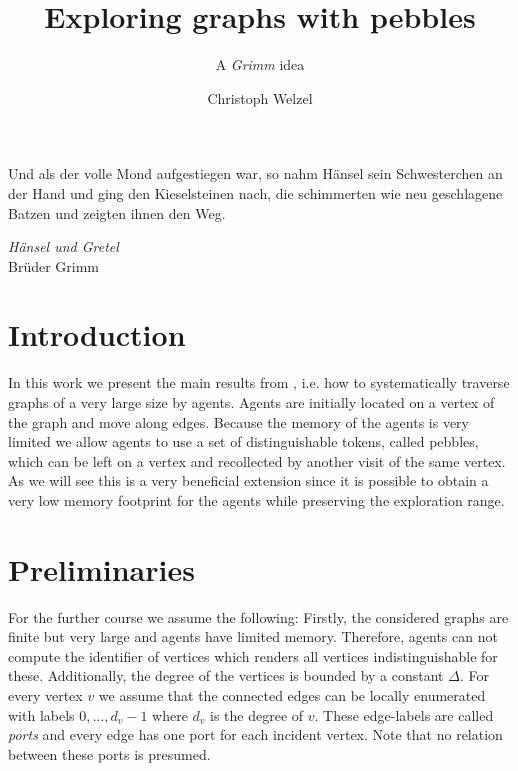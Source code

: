 \documentclass[oneside]{scrartcl}
\begin{document}
\setlength{\epigraphwidth}{0.7\textwidth}

\title{Exploring graphs with pebbles}
\subtitle{A \emph{Grimm} idea}
\author{Christoph Welzel}
\maketitle

\epigraph{Und als der volle Mond aufgestiegen war, so nahm Hänsel sein %
Schwesterchen an der Hand und ging den Kieselsteinen nach, die schimmerten %
wie neu geschlagene Batzen und zeigten ihnen den Weg.}%
{\emph{Hänsel und Gretel}\\Brüder Grimm}

\section{Introduction}
In this work we present the main results from \cite{pebbles}, i.e.
how to systematically traverse graphs of a very large size by agents.
Agents are initially located on a vertex of the graph and move along edges.
Because the memory of the agents is very limited we allow agents to use a set
of distinguishable tokens, called pebbles, which can be left on a vertex and
recollected by another visit of the same vertex. As we will see this is a very
beneficial extension since it is possible to obtain a very low memory footprint
for the agents while preserving the exploration range.

\section{Preliminaries}
For the further course we assume the following: Firstly, the considered
graphs are finite but very large and agents have limited memory. Therefore,
agents can not compute the identifier of vertices which renders all vertices
indistinguishable for these. Additionally, the degree of the vertices is
bounded by a constant $\Delta$. For every vertex $v$ we assume that the
connected edges can be locally enumerated with labels $0,\dots,d_{v} - 1$
where $d_{v}$ is the degree of $v$. These edge-labels are called \emph{ports}
and every edge has one port for each incident vertex. Note that no
relation between these ports is presumed.
\end{document}
